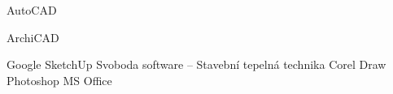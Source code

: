 

\begin{cvskills}

  
  \cvskill
    {AutoCAD} %
    {\lvlfour}
    
  \cvskill
    {ArchiCAD} %
    {\lvlthree}
  
  \cvskill
    {Google SketchUp} %
    {\lvlfour}
  \cvskill
    {Svoboda software – Stavební tepelná technika}
    {\lvlfour}
    \cvskill
    {Corel Draw}
    {\lvlthree}
    \cvskill
    {Photoshop}
    {\lvltwo}
    \cvskill
    {MS Office}
    {\lvlfour}
\end{cvskills}
